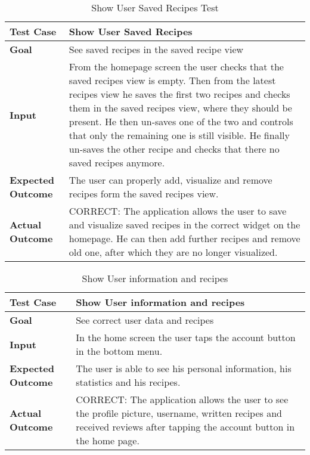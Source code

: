 \begin{table}[H]
	\centering
	\begin{tabular}{|l|l|}
		\hline
		\textbf{Test Case}& Show User Saved Recipes\\
		\hline
		\textbf{Goal}& See saved recipes in the saved recipe view\\
		\hline
		\textbf{Input}& 
		\begin{minipage}{.7\linewidth}
			From the homepage screen the user checks that the saved recipes view is empty. Then from the latest recipes view he saves the first two recipes and checks them in the saved recipes view, where they should be present. He then un-saves one of the two and controls that only the remaining one is still visible. He finally un-saves the other recipe and checks that there no saved recipes anymore.
		\end{minipage}\\
		\hline
		\textbf{Expected Outcome}&
		\begin{minipage}{.7\linewidth}
		The user can properly add, visualize and remove recipes form the saved recipes view.
		\end{minipage}\\
		\hline
		\textbf{Actual Outcome}& 
		\begin{minipage}{.7\linewidth}
			CORRECT: The application allows the user to save and visualize saved recipes in the correct widget on the homepage. He can then add further recipes and remove old one, after which they are no longer visualized.
		\end{minipage}\\
		\hline	
	\end{tabular}
	\caption{Show User Saved Recipes Test}
\end{table}

\begin{table}[H]
	\centering
	\begin{tabular}{|l|l|}
	\hline
	\textbf{Test Case}& Show User information and recipes\\
	\hline
	\textbf{Goal}& See correct user data and recipes\\
	\hline
	\textbf{Input}& 
	\begin{minipage}{.7\linewidth}
	In the home screen the user taps the account button in the bottom menu.
	\end{minipage}\\
	\hline
	\textbf{Expected Outcome}& 
	\begin{minipage}{.7\linewidth}
	The user is able to see his personal information, his statistics and his recipes.
	\end{minipage}\\
	\hline
	\textbf{Actual Outcome}&
	\begin{minipage}{.7\linewidth}
	CORRECT: The application allows the user to see the profile picture, username, written recipes and received reviews after tapping the account button in the home page.
	\end{minipage}\\
	\hline	
	\end{tabular}
	\caption{Show User information and recipes}
\end{table}

